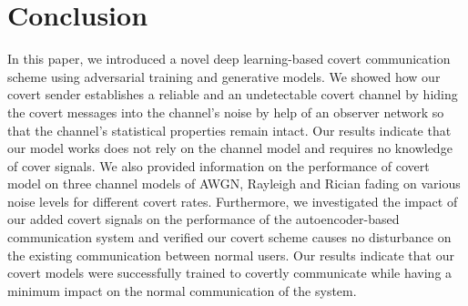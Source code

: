 \section{Conclusion}
\label{s:conc}
In this paper, we introduced a novel deep learning-based covert communication scheme using adversarial training and generative models. We showed how our covert sender establishes a reliable and an undetectable covert channel by hiding the covert messages into the channel's noise by help of an observer network so that the channel's statistical properties remain intact. Our results indicate that our model works does not rely on the channel model and requires no knowledge of cover signals. We also provided information on the performance of covert model on three channel models of AWGN, Rayleigh and Rician fading on various noise levels for different covert rates. Furthermore, we investigated the impact of our added covert signals on the performance of the autoencoder-based communication system and verified our covert scheme causes no disturbance on the existing communication between normal users. Our results indicate that our covert models were successfully trained to covertly communicate while having a minimum impact on the normal communication of the system.